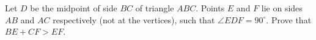 Let $D$ be the midpoint of side $BC$ of triangle $ABC$. Points $E$ and $F$ lie on sides $AB$ and $AC$ respectively (not at the vertices), such that $\angle EDF=90^\circ$. Prove that $BE+CF>EF$.
